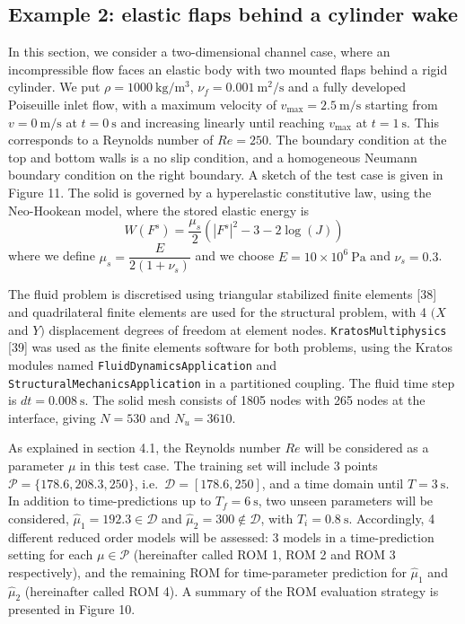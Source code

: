 \documentclass[11pt]{article}
\begin{document}
\subsection{Example 2: elastic flaps behind a cylinder wake}

In this section, we consider a two-dimensional channel case, where an incompressible flow faces an elastic body with two mounted flaps behind a rigid cylinder. We put $\rho = 1000\ \mathrm{kg/m^3}$, $\nu_f = 0.001\ \mathrm{m^2/s}$ and a fully developed Poiseuille inlet flow, with a maximum velocity of $v_{\max} = 2.5\ \mathrm{m/s}$ starting from $v = 0\ \mathrm{m/s}$ at $t = 0\ \mathrm{s}$ and increasing linearly until reaching $v_{\max}$ at $t = 1\ \mathrm{s}$. This corresponds to a Reynolds number of $Re = 250$. The boundary condition at the top and bottom walls is a no slip condition, and a homogeneous Neumann boundary condition on the right boundary. A sketch of the test case is given in Figure 11. The solid is governed by a hyperelastic constitutive law, using the Neo-Hookean model, where the stored elastic energy is
\begin{equation}
\tag{29}
W(F^s) = \frac{\mu_s}{2}\left(|F^s|^2 - 3 - 2\log(J)\right)
\end{equation}
where we define $\mu_s = \dfrac{E}{2(1 + \nu_s)}$ and we choose $E = 10 \times 10^6\ \mathrm{Pa}$ and $\nu_s = 0.3$.

The fluid problem is discretised using triangular stabilized finite elements [38] and quadrilateral finite elements are used for the structural problem, with 4 $(X$ and $Y)$ displacement degrees of freedom at element nodes. \texttt{KratosMultiphysics} [39] was used as the finite elements software for both problems, using the Kratos modules named \texttt{FluidDynamicsApplication} and \texttt{StructuralMechanicsApplication} in a partitioned coupling. The fluid time step is $dt = 0.008\ \mathrm{s}$. The solid mesh consists of 1805 nodes with 265 nodes at the interface, giving $N = 530$ and $N_u = 3610$.

As explained in section 4.1, the Reynolds number $Re$ will be considered as a parameter $\mu$ in this test case. The training set will include 3 points $\mathcal{P} = \{178.6, 208.3, 250\}$, i.e.\ $\mathcal{D} = [178.6, 250]$, and a time domain until $T = 3\ \mathrm{s}$. In addition to time-predictions up to $T_f = 6\ \mathrm{s}$, two unseen parameters will be considered, $\hat{\mu}_1 = 192.3 \in \mathcal{D}$ and $\hat{\mu}_2 = 300 \notin \mathcal{D}$, with $T_i = 0.8\ \mathrm{s}$. Accordingly, 4 different reduced order models will be assessed: 3 models in a time-prediction setting for each $\mu \in \mathcal{P}$ (hereinafter called ROM 1, ROM 2 and ROM 3 respectively), and the remaining ROM for time-parameter prediction for $\hat{\mu}_1$ and $\hat{\mu}_2$ (hereinafter called ROM 4). A summary of the ROM evaluation strategy is presented in Figure 10.
\end{document}
